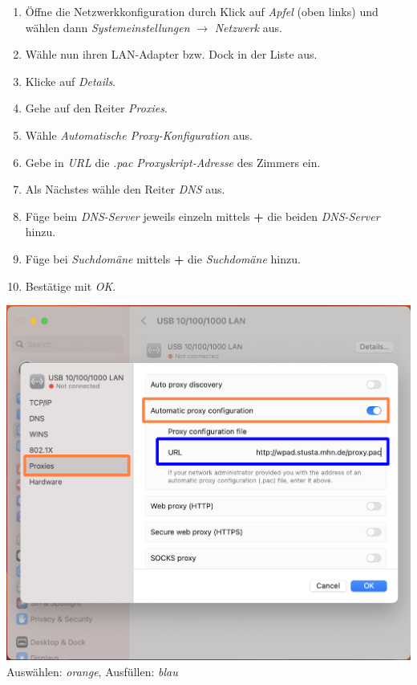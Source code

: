 \documentclass[a4paper,12pt]{scrartcl}
\begin{document}
\begin{minipage}{0.57\textwidth}
	\begin{enumerate}
		\item Öffne die Netzwerkkonfiguration durch Klick auf \textit{Apfel} (oben links) und wählen dann \textit{Systemeinstellungen} $\rightarrow$ \textit{Netzwerk} aus.
		\item Wähle nun ihren LAN-Adapter bzw. Dock in der Liste aus.
		\item Klicke auf \textit{Details}.
		\item Gehe auf den Reiter \textit{Proxies}.
		\item Wähle \textit{Automatische Proxy-Konfiguration} aus.
		\item Gebe in \textit{URL} die \textit{.pac Proxyskript-Adresse} des Zimmers ein.
		\item Als Nächstes wähle den Reiter \textit{DNS} aus.
		\item Füge beim \textit{DNS-Server} jeweils einzeln mittels \textbf{+} die beiden \textit{DNS-Server} hinzu.
		\item Füge bei \textit{Suchdomäne} mittels \textbf{+} die \textit{Suchdomäne} hinzu.
		\item Bestätige mit \textit{OK}.
	\end{enumerate}
\end{minipage}
\hfill
\begin{minipage}{0.4\textwidth}
	\centering
	\includegraphics[width=\linewidth,keepaspectratio]{Bilder/macos/proxy_macos13}
	Auswählen: \textit{orange}, Ausfüllen: \textit{blau}
\end{minipage}
\end{document}
